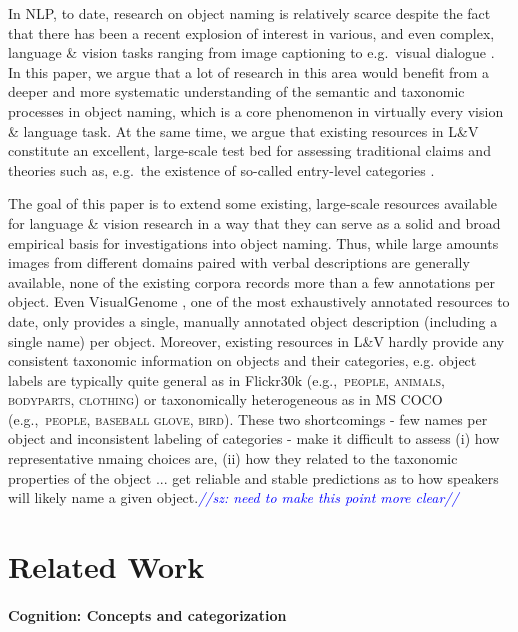 \documentclass[11pt]{article}
\newcommand{\sz}[1]{\textcolor{blue}{\emph{//sz: #1//}}}
\newcommand{\cat}[1]{\textsc{#1}}
\begin{document}
In NLP, to date, research on object naming is relatively scarce despite the fact that
 there has been a recent explosion of interest in various, and even complex, language \& vision tasks ranging from image captioning \cite{fangetal:2015,devlin:imcaqui,Bernardietal:automatic} to e.g.\ visual dialogue \cite{das2017visual,vries2017guesswhat}.
In this paper, we argue that a lot of research in this area would benefit from a deeper and more systematic understanding of the semantic and taxonomic processes in object naming, which is a core phenomenon in virtually every vision \& language task.
At the same time, we argue that existing resources in L\&V constitute an excellent, large-scale test bed for assessing traditional claims and theories such as, e.g.\ the existence of so-called entry-level categories  \cite{rosch1976basic}.

The goal of this paper is to extend some existing, large-scale resources available for language \& vision research in a way that they can serve as a solid and broad empirical basis for investigations into object naming. 
Thus, while large amounts images from different domains paired with verbal descriptions are generally available, none of the existing corpora records more than a few annotations per object.
Even VisualGenome \cite{krishna2016visualgenome}, one of the most exhaustively annotated resources to date, only provides a single, manually annotated object description (including a single name) per object. 
Moreover, existing resources in L\&V hardly provide any consistent taxonomic information on objects and their categories, e.g. object labels are typically quite general as in Flickr30k \cite{plummer2015flickr30kentities} (e.g.,~\cat{people, animals, bodyparts, clothing}) or taxonomically heterogeneous as in MS COCO \cite{mscoco} (e.g.,~\cat{people, baseball glove, bird}).
These two shortcomings - few names per object and inconsistent labeling of categories - make it difficult to assess (i) how representative nmaing choices are, (ii) how they related to the taxonomic properties of the object  ... get reliable and stable predictions as to how speakers will likely name a given object.\sz{need to make this point more clear}


\section{Related Work}
\label{sec:related}

\paragraph{Cognition: Concepts and categorization}
\end{document}
